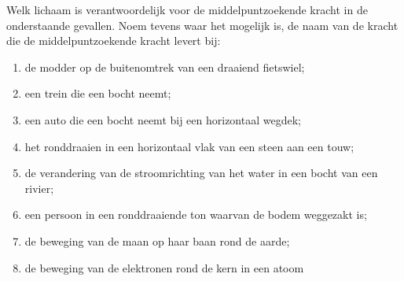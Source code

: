 
\begin{exercise}




 Welk lichaam is verantwoordelijk voor de middelpuntzoekende kracht in de onderstaande gevallen. Noem tevens waar het mogelijk
is, de naam van de kracht die de middelpuntzoekende kracht levert bij:
\begin{enumerate}
\item de modder op de buitenomtrek van een draaiend fietswiel;
\item een trein die een bocht neemt;
\item een auto die een bocht neemt bij een horizontaal wegdek;
\item het ronddraaien in een horizontaal vlak van een steen aan een touw;
\item de verandering van de stroomrichting van het water in een bocht van een rivier;
\item een persoon in een ronddraaiende ton waarvan de bodem weggezakt is;
\item de beweging van de maan op haar baan rond de aarde;
\item de beweging van de elektronen rond de kern in een atoom
\end{enumerate}

\end{exercise}
